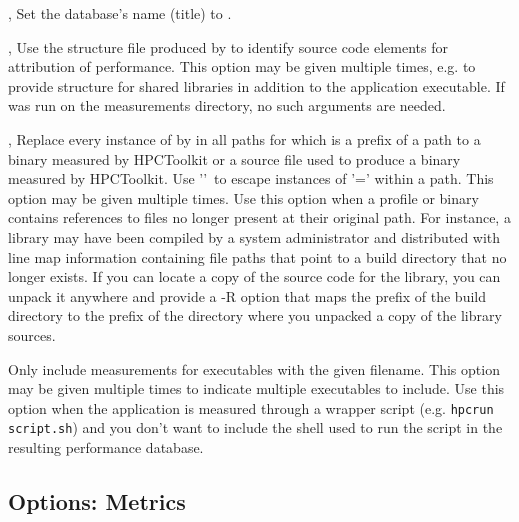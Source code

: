\documentclass[english]{article}
\begin{document}
\begin{Description}
\item[\OptArg{--name}{name}, \OptArg{--title}{name}]
Set the database's name (title) to .

\item[\OptArg{-S}{file}, \OptArg{--structure}{file}]
Use the structure file  produced by 
to identify source code elements for attribution of performance.
This option may be given multiple times,
e.g. to provide structure for shared libraries in addition to the application executable.
If  was run on the measurements directory, no such arguments are needed.

\item[\OptArg{-R}{'old-path=new-path'}, \OptArg{--replace-path}{'old-path=new-path'}]
Replace every instance of  by 
in all paths for which  is a prefix of a path to a binary measured by HPCToolkit
or a source file used to produce a binary measured by HPCToolkit.
Use '\Bs'\ to escape instances of '=' within a path.
This option may be given multiple times.
\medskip
Use this option when a profile or binary contains references to files no
longer present at their original path.
For instance, a library may have been compiled by a system administrator and
distributed with line map information containing file paths that point to a
build directory that no longer exists.
If you can locate a copy of the source code for the library, you can unpack
it anywhere and provide a -R option that maps the prefix of the build
directory to the prefix of the directory where you unpacked a copy of the library sources.

\item[\OptArg{--only-exe}{filename}]
Only include measurements for executables with the given filename. This option may be
given multiple times to indicate multiple executables to include.
\medskip
Use this option when the application is measured through a wrapper script
(e.g. \texttt{hpcrun script.sh}) and you don't want to include the shell used to run the script in the
resulting performance database.

\end{Description}

\subsection{Options: Metrics}
\end{document}

